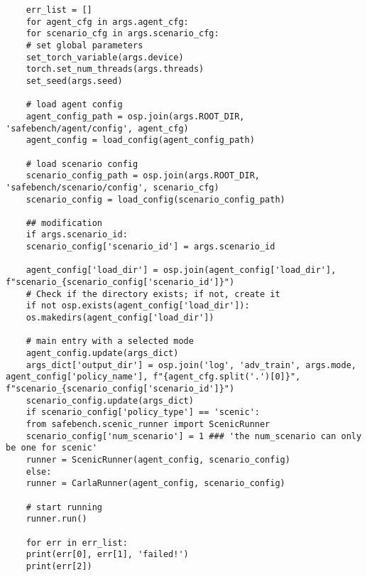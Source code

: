 \begin{lstlisting}
	err_list = []
	for agent_cfg in args.agent_cfg:
	for scenario_cfg in args.scenario_cfg:
	# set global parameters
	set_torch_variable(args.device)
	torch.set_num_threads(args.threads)
	set_seed(args.seed)
	
	# load agent config
	agent_config_path = osp.join(args.ROOT_DIR, 'safebench/agent/config', agent_cfg)
	agent_config = load_config(agent_config_path)
	
	# load scenario config
	scenario_config_path = osp.join(args.ROOT_DIR, 'safebench/scenario/config', scenario_cfg)
	scenario_config = load_config(scenario_config_path)
	
	## modification
	if args.scenario_id:
	scenario_config['scenario_id'] = args.scenario_id
	
	agent_config['load_dir'] = osp.join(agent_config['load_dir'], f"scenario_{scenario_config['scenario_id']}")
	# Check if the directory exists; if not, create it
	if not osp.exists(agent_config['load_dir']):
	os.makedirs(agent_config['load_dir'])        
	
	# main entry with a selected mode
	agent_config.update(args_dict)
	args_dict['output_dir'] = osp.join('log', 'adv_train', args.mode, agent_config['policy_name'], f"{agent_cfg.split('.')[0]}", f"scenario_{scenario_config['scenario_id']}")
	scenario_config.update(args_dict)
	if scenario_config['policy_type'] == 'scenic':
	from safebench.scenic_runner import ScenicRunner
	scenario_config['num_scenario'] = 1 ### 'the num_scenario can only be one for scenic'
	runner = ScenicRunner(agent_config, scenario_config)
	else:
	runner = CarlaRunner(agent_config, scenario_config)
	
	# start running
	runner.run()
	
	for err in err_list:
	print(err[0], err[1], 'failed!')
	print(err[2])
\end{lstlisting}


